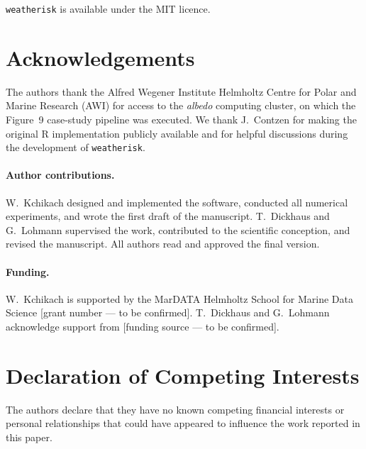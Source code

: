 \documentclass[preprint,12pt,a4paper]{elsarticle}
\newcommand{\revg}[1]{{#1}}
\begin{document}
\revg{\texttt{weatherisk} is available under the MIT licence.}

\section*{Acknowledgements}

The authors thank the Alfred Wegener Institute Helmholtz Centre for
Polar and Marine Research (AWI) for access to the \emph{albedo}
computing cluster, on which the Figure~9 case-study pipeline was
executed. We thank J.~Contzen for making the original R
implementation publicly available and for helpful discussions during
the development of \texttt{weatherisk}.

\paragraph*{Author contributions.}
W.~Kchikach designed and implemented the software, conducted all
numerical experiments, and wrote the first draft of the manuscript.
T.~Dickhaus and G.~Lohmann supervised the work, contributed to the
scientific conception, and revised the manuscript. All authors read
and approved the final version.

\paragraph*{Funding.}
W.~Kchikach is supported by the MarDATA Helmholtz School for Marine
Data Science [grant number --- to be confirmed]. T.~Dickhaus and
G.~Lohmann acknowledge support from [funding source --- to be confirmed].

\section*{Declaration of Competing Interests}

The authors declare that they have no known competing financial
interests or personal relationships that could have appeared to
influence the work reported in this paper.

\appendix
\end{document}
